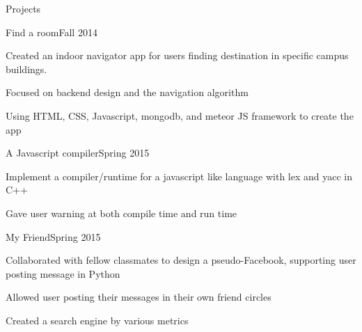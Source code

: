 \documentclass{resume} %
\begin{document}
\begin{rSection}{Projects}

\begin{rSubsection}{Find a room}{Fall 2014}{}{}
\item Created an indoor navigator app for users finding destination in specific campus buildings.
\item Focused on backend design and the navigation algorithm
\item Using HTML, CSS, Javascript, mongodb, and meteor JS framework to create the app
\end{rSubsection}

\begin{rSubsection}{A Javascript compiler}{Spring 2015}{}{}
\item Implement a compiler/runtime for a javascript like language with lex and yacc in C++
\item Gave user warning at both compile time and run time
\end{rSubsection}

\begin{rSubsection}{My Friend}{Spring 2015}{}{}
\item Collaborated with fellow classmates to design a pseudo-Facebook, supporting user posting message in Python
\item Allowed user posting their messages in their own friend circles
\item Created a search engine by various metrics
\end{rSubsection}









\end{rSection}
\end{document}
